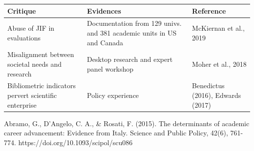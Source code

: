 \documentclass[]{elsarticle} %
\begin{document}
\begin{longtable}[]{@{}lll@{}}
\toprule
\begin{minipage}[b]{0.29\columnwidth}\raggedright
Critique\strut
\end{minipage} & \begin{minipage}[b]{0.32\columnwidth}\raggedright
Evidences\strut
\end{minipage} & \begin{minipage}[b]{0.29\columnwidth}\raggedright
Reference\strut
\end{minipage}\tabularnewline
\midrule
\endhead
\begin{minipage}[t]{0.29\columnwidth}\raggedright
Abuse of JIF in evaluations\strut
\end{minipage} & \begin{minipage}[t]{0.32\columnwidth}\raggedright
Documentation from 129 univs. and 381 academic units in US and
Canada\strut
\end{minipage} & \begin{minipage}[t]{0.29\columnwidth}\raggedright
McKiernan et al., 2019\strut
\end{minipage}\tabularnewline
\begin{minipage}[t]{0.29\columnwidth}\raggedright
Misalignment between societal needs and research\strut
\end{minipage} & \begin{minipage}[t]{0.32\columnwidth}\raggedright
Desktop research and expert panel workshop\strut
\end{minipage} & \begin{minipage}[t]{0.29\columnwidth}\raggedright
Moher et al., 2018\strut
\end{minipage}\tabularnewline
\begin{minipage}[t]{0.29\columnwidth}\raggedright
Bibliometric indicators pervert scientific enterprise\strut
\end{minipage} & \begin{minipage}[t]{0.32\columnwidth}\raggedright
Policy experience\strut
\end{minipage} & \begin{minipage}[t]{0.29\columnwidth}\raggedright
Benedictus (2016), Edwards (2017)\strut
\end{minipage}\tabularnewline
\bottomrule
\end{longtable}

Abramo, G., D'Angelo, C. A., \& Rosati, F. (2015). The determinants of
academic career advancement: Evidence from Italy. Science and Public
Policy, 42(6), 761-774. https://doi.org/10.1093/scipol/scu086
\end{document}
